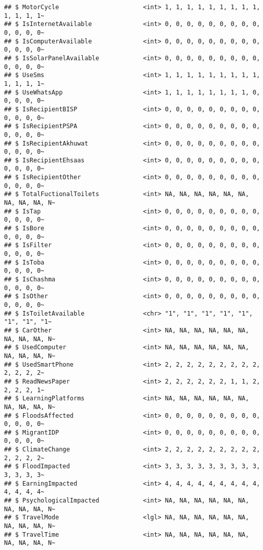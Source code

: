 \documentclass[
]{article}
\begin{document}
\begin{verbatim}
## $ MotorCycle                       <int> 1, 1, 1, 1, 1, 1, 1, 1, 1, 1, 1, 1, 1~
## $ IsInternetAvailable              <int> 0, 0, 0, 0, 0, 0, 0, 0, 0, 0, 0, 0, 0~
## $ IsComputerAvailable              <int> 0, 0, 0, 0, 0, 0, 0, 0, 0, 0, 0, 0, 0~
## $ IsSolarPanelAvailable            <int> 0, 0, 0, 0, 0, 0, 0, 0, 0, 0, 0, 0, 0~
## $ UseSms                           <int> 1, 1, 1, 1, 1, 1, 1, 1, 1, 1, 1, 1, 1~
## $ UseWhatsApp                      <int> 1, 1, 1, 1, 1, 1, 1, 1, 0, 0, 0, 0, 0~
## $ IsRecipientBISP                  <int> 0, 0, 0, 0, 0, 0, 0, 0, 0, 0, 0, 0, 0~
## $ IsRecipientPSPA                  <int> 0, 0, 0, 0, 0, 0, 0, 0, 0, 0, 0, 0, 0~
## $ IsRecipientAkhuwat               <int> 0, 0, 0, 0, 0, 0, 0, 0, 0, 0, 0, 0, 0~
## $ IsRecipientEhsaas                <int> 0, 0, 0, 0, 0, 0, 0, 0, 0, 0, 0, 0, 0~
## $ IsRecipientOther                 <int> 0, 0, 0, 0, 0, 0, 0, 0, 0, 0, 0, 0, 0~
## $ TotalFuctionalToilets            <int> NA, NA, NA, NA, NA, NA, NA, NA, NA, N~
## $ IsTap                            <int> 0, 0, 0, 0, 0, 0, 0, 0, 0, 0, 0, 0, 0~
## $ IsBore                           <int> 0, 0, 0, 0, 0, 0, 0, 0, 0, 0, 0, 0, 0~
## $ IsFilter                         <int> 0, 0, 0, 0, 0, 0, 0, 0, 0, 0, 0, 0, 0~
## $ IsToba                           <int> 0, 0, 0, 0, 0, 0, 0, 0, 0, 0, 0, 0, 0~
## $ IsChashma                        <int> 0, 0, 0, 0, 0, 0, 0, 0, 0, 0, 0, 0, 0~
## $ IsOther                          <int> 0, 0, 0, 0, 0, 0, 0, 0, 0, 0, 0, 0, 0~
## $ IsToiletAvailable                <chr> "1", "1", "1", "1", "1", "1", "1", "1~
## $ CarOther                         <int> NA, NA, NA, NA, NA, NA, NA, NA, NA, N~
## $ UsedComputer                     <int> NA, NA, NA, NA, NA, NA, NA, NA, NA, N~
## $ UsedSmartPhone                   <int> 2, 2, 2, 2, 2, 2, 2, 2, 2, 2, 2, 2, 2~
## $ ReadNewsPaper                    <int> 2, 2, 2, 2, 2, 2, 1, 1, 2, 2, 2, 2, 1~
## $ LearningPlatforms                <int> NA, NA, NA, NA, NA, NA, NA, NA, NA, N~
## $ FloodsAffected                   <int> 0, 0, 0, 0, 0, 0, 0, 0, 0, 0, 0, 0, 0~
## $ MigrantIDP                       <int> 0, 0, 0, 0, 0, 0, 0, 0, 0, 0, 0, 0, 0~
## $ ClimateChange                    <int> 2, 2, 2, 2, 2, 2, 2, 2, 2, 2, 2, 2, 2~
## $ FloodImpacted                    <int> 3, 3, 3, 3, 3, 3, 3, 3, 3, 3, 3, 3, 3~
## $ EarningImpacted                  <int> 4, 4, 4, 4, 4, 4, 4, 4, 4, 4, 4, 4, 4~
## $ PsychologicalImpacted            <int> NA, NA, NA, NA, NA, NA, NA, NA, NA, N~
## $ TravelMode                       <lgl> NA, NA, NA, NA, NA, NA, NA, NA, NA, N~
## $ TravelTime                       <int> NA, NA, NA, NA, NA, NA, NA, NA, NA, N~

\end{verbatim}
\end{document}
